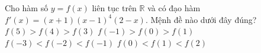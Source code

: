 \begin{ex}%
	Cho hàm số $y=f(x)$ liên tục  trên $\mathbb{R}$ và có đạo hàm $f'(x)=(x+1)(x-1)^4(2-x)$. Mệnh đề nào dưới đây đúng?
	\choice 
		 {$f(5)>f(4)>f(3)$}
		 {$f(-1)>f(0)>f(1)$}
		 {$f(-3)<f(-2)<f(-1)$}
		{\True $f(0)<f(1)<f(2)$} 
\end{ex}

